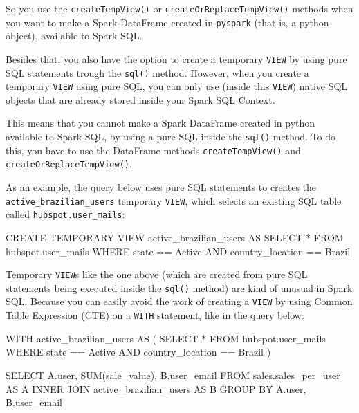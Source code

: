 \documentclass[
  11pt,
  letterpaper,
  DIV=11,
  numbers=noendperiod]{scrreprt}
\newenvironment{Shaded}{\begin{snugshade}}{\end{snugshade}}
\newcommand{\FunctionTok}[1]{\textcolor[rgb]{0.28,0.35,0.67}{#1}}
\newcommand{\KeywordTok}[1]{\textcolor[rgb]{0.00,0.23,0.31}{#1}}
\newcommand{\NormalTok}[1]{\textcolor[rgb]{0.00,0.23,0.31}{#1}}
\newcommand{\OperatorTok}[1]{\textcolor[rgb]{0.37,0.37,0.37}{#1}}
\newcommand{\StringTok}[1]{\textcolor[rgb]{0.13,0.47,0.30}{#1}}
\begin{document}
So you use the \texttt{createTempView()} or
\texttt{createOrReplaceTempView()} methods when you want to make a Spark
DataFrame created in \texttt{pyspark} (that is, a python object),
available to Spark SQL.

Besides that, you also have the option to create a temporary
\texttt{VIEW} by using pure SQL statements trough the \texttt{sql()}
method. However, when you create a temporary \texttt{VIEW} using pure
SQL, you can only use (inside this \texttt{VIEW}) native SQL objects
that are already stored inside your Spark SQL Context.

This means that you cannot make a Spark DataFrame created in python
available to Spark SQL, by using a pure SQL inside the \texttt{sql()}
method. To do this, you have to use the DataFrame methods
\texttt{createTempView()} and \texttt{createOrReplaceTempView()}.

As an example, the query below uses pure SQL statements to creates the
\texttt{active\_brazilian\_users} temporary \texttt{VIEW}, which selects
an existing SQL table called \texttt{hubspot.user\_mails}:

\begin{Shaded}
\begin{Highlighting}[]
\KeywordTok{CREATE} \KeywordTok{TEMPORARY} \KeywordTok{VIEW}\NormalTok{ active\_brazilian\_users }\KeywordTok{AS}
\KeywordTok{SELECT} \OperatorTok{*}
\KeywordTok{FROM}\NormalTok{ hubspot.user\_mails}
\KeywordTok{WHERE}\NormalTok{ state }\OperatorTok{==} \StringTok{\textquotesingle{}Active\textquotesingle{}}
\KeywordTok{AND}\NormalTok{ country\_location }\OperatorTok{==} \StringTok{\textquotesingle{}Brazil\textquotesingle{}}
\end{Highlighting}
\end{Shaded}

Temporary \texttt{VIEW}s like the one above (which are created from pure
SQL statements being executed inside the \texttt{sql()} method) are kind
of unusual in Spark SQL. Because you can easily avoid the work of
creating a \texttt{VIEW} by using Common Table Expression (CTE) on a
\texttt{WITH} statement, like in the query below:

\begin{Shaded}
\begin{Highlighting}[]
\KeywordTok{WITH}\NormalTok{ active\_brazilian\_users }\KeywordTok{AS}\NormalTok{ (}
  \KeywordTok{SELECT} \OperatorTok{*}
  \KeywordTok{FROM}\NormalTok{ hubspot.user\_mails}
  \KeywordTok{WHERE}\NormalTok{ state }\OperatorTok{==} \StringTok{\textquotesingle{}Active\textquotesingle{}}
  \KeywordTok{AND}\NormalTok{ country\_location }\OperatorTok{==} \StringTok{\textquotesingle{}Brazil\textquotesingle{}}
\NormalTok{)}

\KeywordTok{SELECT}\NormalTok{ A.}\FunctionTok{user}\NormalTok{, }\FunctionTok{SUM}\NormalTok{(sale\_value), B.user\_email}
\KeywordTok{FROM}\NormalTok{ sales.sales\_per\_user }\KeywordTok{AS}\NormalTok{ A}
\KeywordTok{INNER} \KeywordTok{JOIN}\NormalTok{ active\_brazilian\_users }\KeywordTok{AS}\NormalTok{ B}
\KeywordTok{GROUP} \KeywordTok{BY}\NormalTok{ A.}\FunctionTok{user}\NormalTok{, B.user\_email}
\end{Highlighting}
\end{Shaded}
\end{document}
